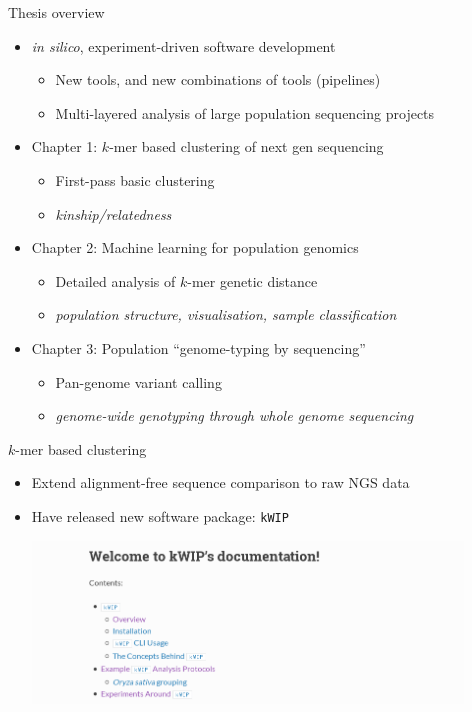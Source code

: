 \documentclass[t]{beamer}
\begin{document}
\begin{frame}{Thesis overview}
  \begin{itemize}
    \item \textit{in silico}, experiment-driven software development
      \begin{itemize}
        \item New tools, and new combinations of tools (pipelines)
        \item Multi-layered analysis of large population sequencing projects
      \end{itemize}
    \pause
    \item Chapter 1: $k$-mer based clustering of next gen sequencing
      \begin{itemize}
        \item First-pass basic clustering
        \item \textit{kinship/relatedness}
      \end{itemize}
    \pause
    \item Chapter 2: Machine learning for population genomics
      \begin{itemize}
        \item Detailed analysis of $k$-mer genetic distance
        \item \textit{population structure, visualisation, sample classification}
      \end{itemize}
    \pause
    \item Chapter 3: Population ``genome-typing by sequencing''
      \begin{itemize}
        \item Pan-genome variant calling
        \item \textit{genome-wide genotyping through whole genome sequencing}
      \end{itemize}
  \end{itemize}
\end{frame}

\begin{frame}{$k$-mer based clustering}
  \begin{itemize}
    \item Extend alignment-free sequence comparison to raw NGS data
    \item Have released new software package: \texttt{kWIP}
      \begin{center}
        \includegraphics[width=0.9\textwidth]{img/kwip-doc-screenshot.png}
      \end{center}
  \end{itemize}
\end{frame}
\end{document}
